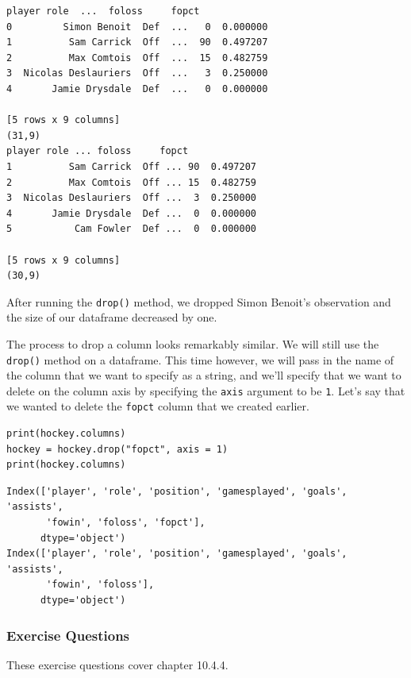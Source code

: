 \begin{lstlisting}[style=none]
player role  ...  foloss     fopct
0         Simon Benoit  Def  ...   0  0.000000
1          Sam Carrick  Off  ...  90  0.497207
2          Max Comtois  Off  ...  15  0.482759
3  Nicolas Deslauriers  Off  ...   3  0.250000
4       Jamie Drysdale  Def  ...   0  0.000000

[5 rows x 9 columns]
(31,9)
player role ... foloss     fopct
1          Sam Carrick  Off ... 90  0.497207
2          Max Comtois  Off ... 15  0.482759
3  Nicolas Deslauriers  Off ...  3  0.250000
4       Jamie Drysdale  Def ...  0  0.000000
5           Cam Fowler  Def ...  0  0.000000

[5 rows x 9 columns]
(30,9)
\end{lstlisting}
After running the \verb|drop()| method, we dropped Simon Benoit's observation and the size of our dataframe decreased by one.\par
{}
The process to drop a column looks remarkably similar. We will still use the \verb|drop()| method on a dataframe. This time however, we will pass in the name of the column that we want to specify as a string, and we'll specify that we want to delete on the column axis by specifying the \verb|axis| argument to be \verb|1|. Let's say that we wanted to delete the \verb|fopct| column that we created earlier.\par
\begin{lstlisting}[style=pippython]
print(hockey.columns)
hockey = hockey.drop("fopct", axis = 1)
print(hockey.columns)
\end{lstlisting}
\begin{lstlisting}[style=none]
Index(['player', 'role', 'position', 'gamesplayed', 'goals', 'assists',
       'fowin', 'foloss', 'fopct'],
      dtype='object')
Index(['player', 'role', 'position', 'gamesplayed', 'goals', 'assists',
       'fowin', 'foloss'],
      dtype='object')
\end{lstlisting}

\subsubsection*{Exercise Questions}
These exercise questions cover chapter 10.4.4.

